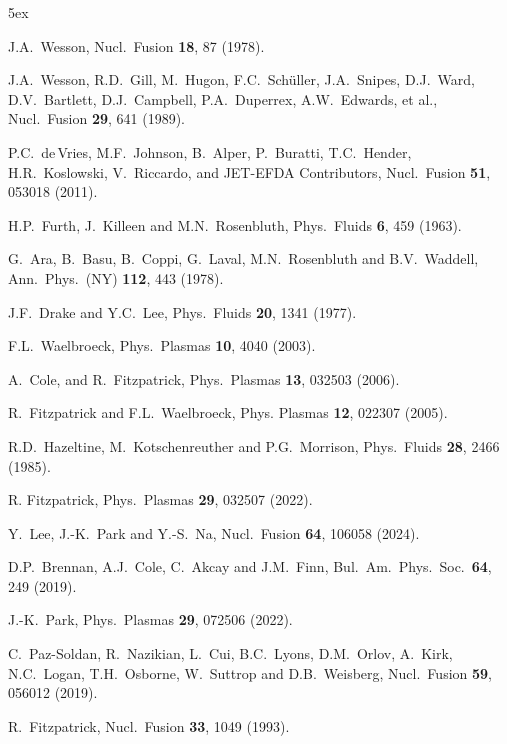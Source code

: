 \documentclass[12pt,prb,aps]{revtex4-1}
\begin{document}
\begin{thebibliography}{99}\baselineskip 5ex

 J.A.~Wesson, Nucl.\ Fusion {\bf 18}, 87 (1978).

 J.A.~Wesson, R.D.~Gill, M.~Hugon, F.C.~Sch\"{u}ller, J.A.~Snipes, D.J.~Ward, D.V.~Bartlett, 
D.J.~Campbell, P.A.~Duperrex, A.W.~Edwards, et al., Nucl.\ Fusion {\bf 29}, 641 (1989).

 P.C.~de\,Vries, M.F.~Johnson, B.~Alper, P.~Buratti, T.C.~Hender, H.R.~Koslowski, V.~Riccardo, and JET-EFDA Contributors, Nucl.\ Fusion {\bf 51}, 053018 (2011).

 H.P.~Furth, J.~Killeen and M.N.~Rosenbluth, Phys.\ Fluids {\bf 6}, 459 (1963).

 G.~Ara, B.~Basu, B.~Coppi, G.~Laval, M.N.~Rosenbluth and B.V.~Waddell, Ann.\ Phys.\ (NY) {\bf 112}, 443 (1978).

 J.F.~Drake and Y.C.~Lee, Phys.\ Fluids {\bf 20}, 1341 (1977).

 F.L.~Waelbroeck, Phys.\ Plasmas {\bf 10}, 4040 (2003).

 A.~Cole, and R.~Fitzpatrick, Phys.\ Plasmas {\bf 13}, 032503 (2006).

 R.~Fitzpatrick and F.L.~Waelbroeck, Phys. Plasmas {\bf 12}, 022307 (2005).

 R.D.~Hazeltine, M.~Kotschenreuther and P.G.~Morrison, Phys.\ Fluids {\bf 28}, 2466 (1985).

 R. Fitzpatrick,  Phys.\ Plasmas {\bf 29}, 032507 (2022).

 Y.~Lee, J.-K.~Park and Y.-S.~Na, Nucl.\ Fusion {\bf 64}, 106058 (2024).

 D.P.~Brennan, A.J.~Cole, C.~Akcay and J.M.~Finn, Bul.\ Am.\ Phys.\ Soc.\ {\bf 64}, 249 (2019).

 J.-K.~Park, Phys.\ Plasmas {\bf 29}, 072506 (2022).

 C.~Paz-Soldan, R.~Nazikian, L.~Cui, B.C.~Lyons, D.M.~Orlov, A.~Kirk, 
N.C.~Logan, T.H.~Osborne, W.~Suttrop and D.B.~Weisberg, Nucl.\ Fusion {\bf 59},
056012 (2019).

 R.~Fitzpatrick, Nucl.\ Fusion {\bf 33}, 1049 (1993).

\end{thebibliography}
\end{document}
